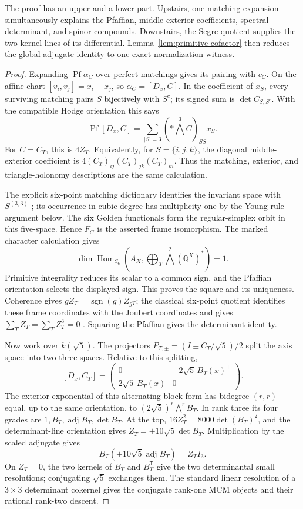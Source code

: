 \documentclass[11pt]{article}
\theoremstyle{definition}
\theoremstyle{remark}
\newcommand{\Pf}{\operatorname{Pf}}
\begin{document}
The proof has an upper and a lower part.  Upstairs, one matching expansion
simultaneously explains the Pfaffian, middle exterior coefficients, spectral
determinant, and spinor compounds.  Downstairs, the Segre quotient supplies
the two kernel lines of its differential.  Lemma~\ref{lem:primitive-cofactor}
then reduces the global adjugate identity to one exact normalization witness.

\begin{proof}
Expanding \(\Pf\alpha_C\) over perfect matchings gives its pairing with
\(c_C\).  On the affine chart \([v_i,v_j]=x_i-x_j\), so
\(\alpha_C=[D_x,C]\).  In the coefficient of \(x_S\), every surviving
matching pairs \(S\) bijectively with \(S^c\); its signed sum is
\(\det C_{S,S^c}\).  With the compatible Hodge orientation this says
\[
 \Pf[D_x,C]=\sum_{|S|=3}(*\!\bigwedge^3C)_{SS}x_S.
\]
For \(C=C_T\), this is \(4Z_T\).  Equivalently, for
\(S=\{i,j,k\}\), the diagonal middle-exterior coefficient is
\(4(C_T)_{ij}(C_T)_{jk}(C_T)_{ki}\).  Thus the matching, exterior, and
triangle-holonomy descriptions are the same calculation.

The explicit six-point matching dictionary identifies the invariant space
with \(S^{(3,3)}\) \cite[Section~2.4]{HMSVOuter}; its occurrence in cubic
degree has multiplicity one by the Young-rule argument below.  The six
Golden functionals form the
regular-simplex orbit in this five-space.  Hence \(F_C\) is the asserted
frame isomorphism.  The marked character calculation gives
\[
 \dim\operatorname{Hom}_{S_6}
   \left(A_X,\bigoplus_T\bigwedge^2(\mathbb Q^X)^*\right)=1.
\]
Primitive integrality reduces its scalar to a common sign, and the
Pfaffian orientation selects the displayed sign.  This proves the square
and its uniqueness.  Coherence gives
\(gZ_T=\operatorname{sgn}(g)Z_{gT}\); the classical six-point quotient
identifies these frame coordinates with the Joubert coordinates and gives
\(\sum_TZ_T=\sum_TZ_T^3=0\) \cite{HMSVOuter,HMSV}.  Squaring the
Pfaffian gives the determinant identity.

Now work over \(k(\sqrt5)\).  The projectors
\(P_{T,\pm}=(I\pm C_T/\sqrt5)/2\) split the axis space into two
three-spaces.  Relative to this splitting,
\[
 [D_x,C_T]=
 \begin{pmatrix}
 0&-2\sqrt5\,B_T(x)^{\mathsf T}\\
 2\sqrt5\,B_T(x)&0
 \end{pmatrix}.
\]
The exterior exponential of this alternating block form has bidegree
\((r,r)\) equal, up to the same orientation, to
\((2\sqrt5)^r\bigwedge^rB_T\).  In rank three its four grades are
\(1,B_T,\operatorname{adj}B_T,\det B_T\).  At the top,
\(16Z_T^2=8000\det(B_T)^2\), and the determinant-line orientation gives
\(Z_T=\pm10\sqrt5\det B_T\).  Multiplication by the scaled adjugate gives
\[
 B_T(\pm10\sqrt5\operatorname{adj}B_T)
 =Z_TI_3.
\]
On \(Z_T=0\), the two kernels of \(B_T\) and \(B_T^{\mathsf T}\) give
the two determinantal small resolutions; conjugating \(\sqrt5\) exchanges
them.  The standard linear resolution of a \(3\times3\) determinant
cokernel gives the conjugate rank-one MCM objects and their rational
rank-two descent.


\end{proof}
\end{document}
